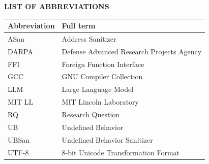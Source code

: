 \thispagestyle{plain}
\begin{center}
{\fontsize{13}{16}\selectfont\bfseries LIST OF ABBREVIATIONS}
\end{center}
\vspace{1em}

\begin{tabularx}{\textwidth}{@{}l X@{}}
\toprule
\textbf{Abbreviation} & \textbf{Full term} \\
\midrule
ASan & Address Sanitizer \\
DARPA & Defense Advanced Research Projects Agency \\
FFI & Foreign Function Interface \\
GCC & GNU Compiler Collection \\
LLM  & Large Language Model \\
MIT LL & MIT Lincoln Laboratory \\
RQ & Research Question \\
UB   & Undefined Behavior \\
UBSan & Undefined Behavior Sanitizer \\
UTF-8 & 8-bit Unicode Transformation Format \\
\bottomrule
\end{tabularx}
\clearpage

